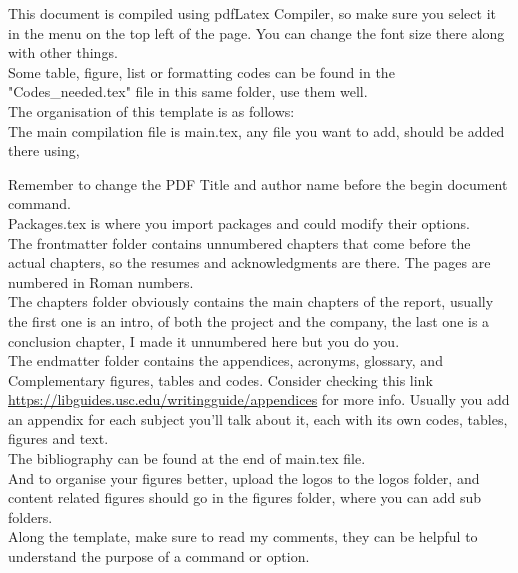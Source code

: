 This document is compiled using pdfLatex Compiler, so make sure you select it in the menu on the top left of the page. You can change the font size there along with other things.
\\

Some table, figure, list or formatting codes can be found in the "Codes\_needed.tex" file in this same folder, use them well.
\\

The organisation of this template is as follows: 
\\
The main compilation file is main.tex, any file you want to add, should be added there using, %

Remember to change the PDF Title and author name before the begin document command.
\\

Packages.tex is where you import packages and could modify their options.
\\

The frontmatter folder contains unnumbered chapters that come before the actual chapters, so the resumes and acknowledgments are there. The pages are numbered in Roman numbers.
\\

The chapters folder obviously contains the main chapters of the report, usually the first one is an intro, of both the project and the company, the last one is a conclusion chapter, I made it unnumbered here but you do you.
\\

The endmatter folder contains the appendices, acronyms, glossary, and Complementary figures, tables and codes. Consider checking this link \url{https://libguides.usc.edu/writingguide/appendices} for more info. Usually you add an appendix for each subject you'll talk about it, each with its own codes, tables, figures and text.
\\

The bibliography can be found at the end of main.tex file.
\\

And to organise your figures better, upload the logos to the logos folder, and content related figures should go in the figures folder, where you can add sub folders.
\\

Along the template, make sure to read my comments, they can be helpful to understand the purpose of a command or option. 
\\

